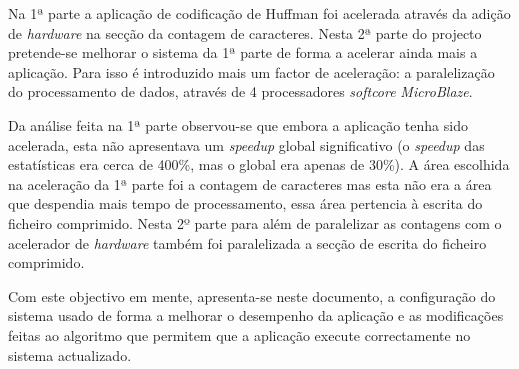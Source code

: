 Na 1ª parte a aplicação de codificação de Huffman foi acelerada através da adição de \textit{hardware} na secção da contagem de caracteres. Nesta 2ª parte do projecto pretende-se melhorar o sistema da 1ª parte de forma a acelerar ainda mais a aplicação. Para isso é introduzido mais um factor de aceleração: a paralelização do processamento de dados, através de 4 processadores \textit{softcore} \textit{MicroBlaze}.

Da análise feita na 1ª parte observou-se que embora a aplicação tenha sido acelerada, esta não apresentava um \textit{speedup} global significativo (o \textit{speedup} das estatísticas era cerca de 400\%, mas o global era apenas de 30\%). A área escolhida na aceleração da 1ª parte foi a contagem de caracteres mas esta não era a área que despendia mais tempo de processamento, essa área pertencia à escrita do ficheiro comprimido. Nesta 2º parte para além de paralelizar as contagens com o acelerador de \textit{hardware} também foi paralelizada a secção de escrita do ficheiro comprimido.

Com este objectivo em mente, apresenta-se neste documento, a configuração do sistema usado de forma a melhorar o desempenho da aplicação e as modificações feitas ao algoritmo que permitem que a aplicação execute correctamente no sistema actualizado.